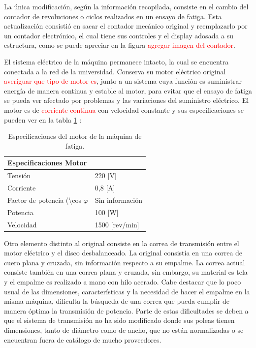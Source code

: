 La única modificación, según la información recopilada, consiste en el cambio del contador de revoluciones o ciclos realizados en un ensayo de fatiga. Esta actualización consistió en sacar el contador mecánico original y reemplazarlo por un contador electrónico, el cual tiene sus controles y el display adosada a su estructura, como se puede apreciar en la figura \textcolor{red}{agregar imagen del contador}. 

El sistema eléctrico de la máquina permanece intacto, la cual se encuentra conectada a la red de la universidad. Conserva su motor eléctrico original \textcolor{red}{averiguar que tipo de motor es}, junto a un sistema cuya función es suministrar energía de manera continua y estable al motor, para evitar que el ensayo de fatiga se pueda ver afectado por problemas y las variaciones del suministro eléctrico. El motor es de \textcolor{red}{corriente continua} con velocidad constante y sus especificaciones se pueden ver en la tabla \ref{tab:motor_maq} :
\begin{table}[h]
\centering
\begin{tabular}{ll}
\hline
Especificaciones Motor                            & \multicolumn{1}{l}{}    \\ \hline
Tensión                                           & 220 {[}V{]}        		\\
Corriente                                         & 0,8 {[}A{]}        		\\
Factor de potencia (\textbackslash{}cos $\varphi$ & Sin información    		\\
Potencia                                          & 100 {[}W{]}        		\\
Velocidad                                         & 1500 {[}rev/min{]} 		\\ \hline
\end{tabular}
\caption{Especificaciones del motor de la máquina de fatiga.}
\label{tab:motor_maq}
\end{table}

Otro elemento distinto al original consiste en la correa de transmisión entre el motor eléctrico y el disco desbalanceado. La original consistía en una correa de cuero plana y cruzada, sin información respecto a su empalme. La correa actual consiste también en una correa plana y cruzada, sin embargo, su material es tela y el empalme es realizado a mano con hilo acerado. Cabe destacar que lo poco usual de las dimensiones, características y la necesidad de hacer el empalme en la misma máquina, dificulta la búsqueda de una correa que pueda cumplir de manera óptima la transmisión de potencia. Parte de estas dificultades se deben a que el sistema de transmisión no ha sido modificado donde sus poleas tienen dimensiones, tanto de diámetro como de ancho, que no están normalizadas o se encuentran fuera de catálogo de mucho proveedores. 

